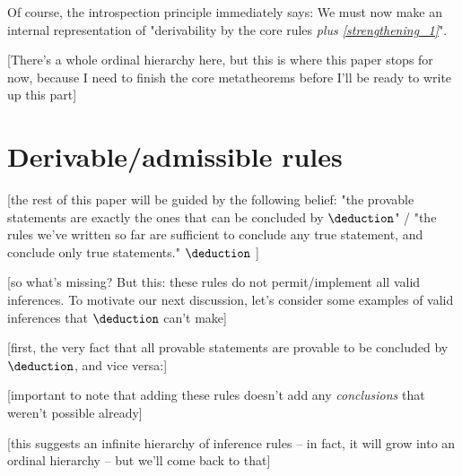 \documentclass{article}
\begin{document}
  Of course, the introspection principle immediately says: We must now make an internal representation of "derivability by the core rules \emph{plus \eqref{strengthening_1}}".
  
  [There's a whole ordinal hierarchy here, but this is where this paper stops for now, because I need to finish the core metatheorems before I'll be ready to write up this part]
  
  
  
  
  \iffalse
  
  
  
    
  \section{Derivable/admissible rules}

  [the rest of this paper will be guided by the following belief: "the provable statements are exactly the ones that can be concluded by $\deduction$" / "the rules we've written so far are sufficient to conclude any true statement, and conclude only true statements." $\deduction$ ]
  
  [so what's missing? But this: these rules do not permit/implement all valid inferences. To motivate our next discussion, let's consider some examples of valid inferences that $\deduction$ can't make]
  
  [first, the very fact that all provable statements are provable to be concluded by $\deduction$, and vice versa:]
  
  [important to note that adding these rules doesn't add any \emph{conclusions} that weren't possible already]
   
  [this suggests an infinite hierarchy of inference rules – in fact, it will grow into an ordinal hierarchy – but we'll come back to that]
  
\end{document}
